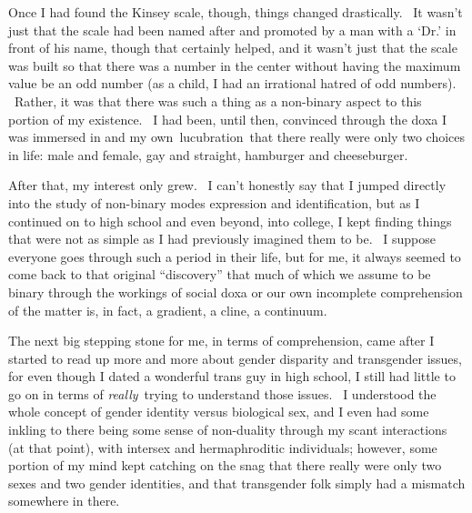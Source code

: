 Once I had found the Kinsey scale, though, things changed drastically.
~It wasn't just that the scale had been named after and promoted by a
man with a `Dr.' in front of his name, though that certainly helped, and
it wasn't just that the scale was built so that there was a number in
the center without having the maximum value be an odd number (as a
child, I had an irrational hatred of odd numbers). ~Rather, it was that
there was such a thing as a non-binary aspect to this portion of my
existence. ~I had been, until then, convinced through the doxa I was
immersed in and my own~lucubration~that there really were only two
choices in life: male and female, gay and straight, hamburger and
cheeseburger.

After that, my interest only grew. ~I can't honestly say that I jumped
directly into the study of non-binary modes expression and
identification, but as I continued on to high school and even beyond,
into college, I kept finding things that were not as simple as I had
previously imagined them to be. ~I suppose everyone goes through such a
period in their life, but for me, it always seemed to come back to that
original ``discovery'' that much of which we assume to be binary through
the workings of social doxa or our own incomplete comprehension of the
matter is, in fact, a gradient, a cline, a continuum.

The next big stepping stone for me, in terms of comprehension, came
after I started to read up more and more about gender disparity and
transgender issues, for even though I dated a wonderful trans guy in
high school, I still had little to go on in terms of
\emph{really}~trying to understand those issues. ~I understood the whole
concept of gender identity versus biological sex, and I even had some
inkling to there being some sense of non-duality through my scant
interactions (at that point), with intersex and hermaphroditic
individuals; however, some portion of my mind kept catching on the snag
that there really were only two sexes and two gender identities, and
that transgender folk simply had a mismatch somewhere in there.

